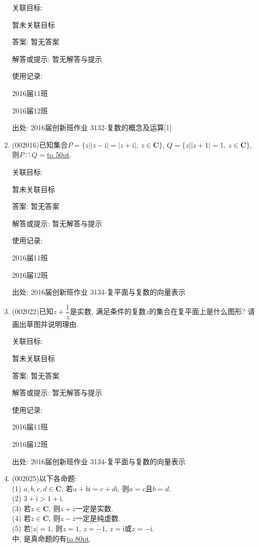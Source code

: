 \documentclass[10pt,a4paper]{article}
\newcommand{\blank}[1]{\underline{\hbox to #1pt{}}}
\begin{document}
\begin{enumerate}[1.]
关联目标:

暂未关联目标

答案: 暂无答案

解答或提示: 暂无解答与提示

使用记录:

2016届11班	

2016届12班	


出处: 2016届创新班作业	3132-复数的概念及运算[1]
\item { (002016)}已知集合$P=\{z||z-\mathrm{i}|=|z+\mathrm{i}|, \ z\in \mathbf{C}\}$, $Q=\{z||z+1|=1, \ z\in \mathbf{C}\}$, 则$P\cap Q=$\blank{50}.


关联目标:

暂未关联目标

答案: 暂无答案

解答或提示: 暂无解答与提示

使用记录:

2016届11班	

2016届12班	


出处: 2016届创新班作业	3134-复平面与复数的向量表示
\item { (002022)}已知$z+\dfrac{1}{z}$是实数, 满足条件的复数$z$的集合在复平面上是什么图形? 请画出草图并说明理由.


关联目标:

暂未关联目标

答案: 暂无答案

解答或提示: 暂无解答与提示

使用记录:

2016届11班	

2016届12班	


出处: 2016届创新班作业	3134-复平面与复数的向量表示
\item { (002025)}以下各命题:\\ 
(1) $a,b,c,d\in \mathbf{C}$, 若$a+b\mathrm{i}=c+d\mathrm{i}$, 则$a=c$且$b=d$.\\ 
(2) $3+\mathrm{i}>1+\mathrm{i}$.\\ 
(3) 若$z\in\mathbf{C}$, 则$z+\bar{z}$一定是实数.\\ 
(4) 若$z\in \mathbf{C}$, 则$z-\bar{z}$一定是纯虚数.\\ 
(5) 若$|z|=1$, 则$z=1$, $z=-1$, $z=\mathrm{i}$或$z=-\mathrm{i}$.\\ 
中, 是真命题的有\blank{80}.



\end{enumerate}
\end{document}
